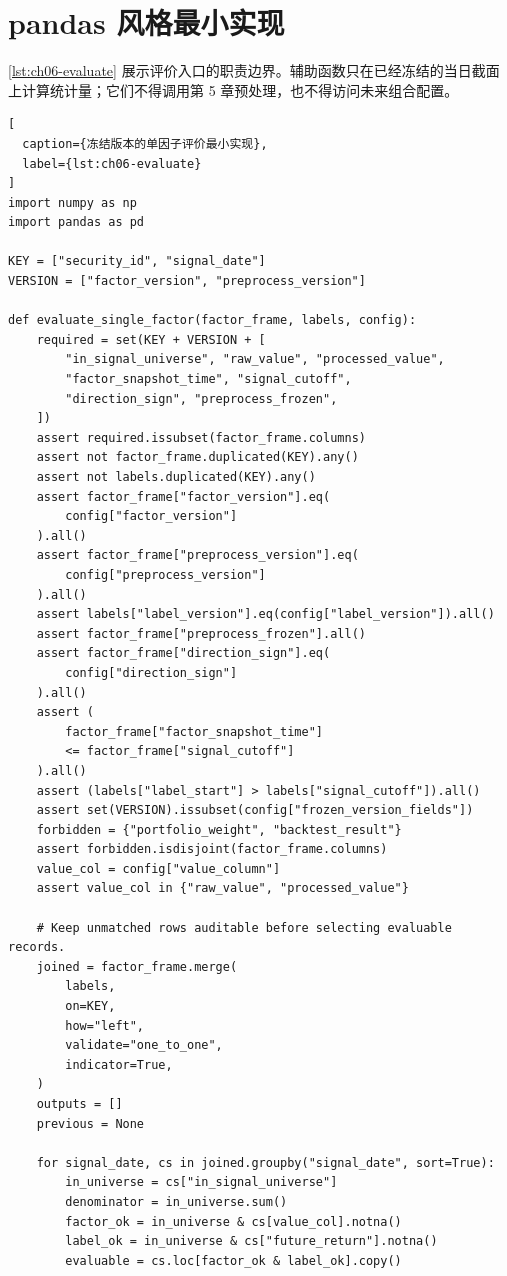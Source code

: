 \section{pandas 风格最小实现}

\cref{lst:ch06-evaluate} 展示评价入口的职责边界。辅助函数只在已经冻结的当日截面上计算统计量；它们不得调用第 5 章预处理，也不得访问未来组合配置。

\begin{lstlisting}[
  caption={冻结版本的单因子评价最小实现},
  label={lst:ch06-evaluate}
]
import numpy as np
import pandas as pd

KEY = ["security_id", "signal_date"]
VERSION = ["factor_version", "preprocess_version"]

def evaluate_single_factor(factor_frame, labels, config):
    required = set(KEY + VERSION + [
        "in_signal_universe", "raw_value", "processed_value",
        "factor_snapshot_time", "signal_cutoff",
        "direction_sign", "preprocess_frozen",
    ])
    assert required.issubset(factor_frame.columns)
    assert not factor_frame.duplicated(KEY).any()
    assert not labels.duplicated(KEY).any()
    assert factor_frame["factor_version"].eq(
        config["factor_version"]
    ).all()
    assert factor_frame["preprocess_version"].eq(
        config["preprocess_version"]
    ).all()
    assert labels["label_version"].eq(config["label_version"]).all()
    assert factor_frame["preprocess_frozen"].all()
    assert factor_frame["direction_sign"].eq(
        config["direction_sign"]
    ).all()
    assert (
        factor_frame["factor_snapshot_time"]
        <= factor_frame["signal_cutoff"]
    ).all()
    assert (labels["label_start"] > labels["signal_cutoff"]).all()
    assert set(VERSION).issubset(config["frozen_version_fields"])
    forbidden = {"portfolio_weight", "backtest_result"}
    assert forbidden.isdisjoint(factor_frame.columns)
    value_col = config["value_column"]
    assert value_col in {"raw_value", "processed_value"}

    # Keep unmatched rows auditable before selecting evaluable records.
    joined = factor_frame.merge(
        labels,
        on=KEY,
        how="left",
        validate="one_to_one",
        indicator=True,
    )
    outputs = []
    previous = None

    for signal_date, cs in joined.groupby("signal_date", sort=True):
        in_universe = cs["in_signal_universe"]
        denominator = in_universe.sum()
        factor_ok = in_universe & cs[value_col].notna()
        label_ok = in_universe & cs["future_return"].notna()
        evaluable = cs.loc[factor_ok & label_ok].copy()


\end{lstlisting}
